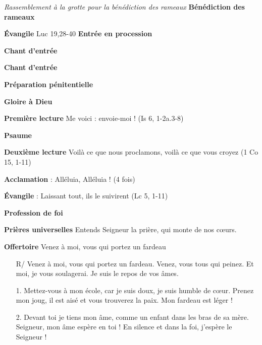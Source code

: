 \documentclass[10pt,a4paper]{article}
\newcommand{\SepRule}{\noindent							 %
						\begin{center}
							\rule{250pt}{1pt}
						\end{center}
						}
\newcommand{\NewsItem}[1]{%
\vspace{4pt}
		\large \textbf{#1} \vspace{4pt}
        \normalsize \normalfont}
\begin{document}





\textit{Rassemblement à la grotte pour la bénédiction des rameaux}
\NewsItem{Bénédiction des rameaux}
	
\NewsItem{Évangile} Luc 19,28-40
\NewsItem{Entrée en procession}

	\NewsItem{Chant d'entrée}
	
\NewsItem{Chant d'entrée}

\NewsItem{Préparation pénitentielle}


\NewsItem{Gloire à Dieu}  


\NewsItem{Première lecture}
\og Me voici : envoie-moi ! \fg (Is 6, 1-2a.3-8)

\NewsItem{Psaume}


\NewsItem{Deuxième lecture}
\og Voilà ce que nous proclamons, voilà ce que vous croyez \fg (1 Co 15, 1-11)


\NewsItem{Acclamation} : Alléluia, Alléluia ! (4 fois)

\NewsItem{Évangile} : \og Laissant tout, ils le suivirent \fg (Lc 5, 1-11)


\NewsItem{Profession de foi} 


\NewsItem{Prières universelles} 
Entends Seigneur la prière, qui monte de nos cœurs.
\newpage

\NewsItem{Offertoire} 
Venez à moi, vous qui portez un fardeau 
\begin{itemize}
\item[R/] Venez à moi, vous qui portez un fardeau. Venez, vous tous qui peinez. 
     Et moi, je vous soulagerai. Je suis le repos de vos âmes.
\item[1.]  Mettez-vous à mon école, car je suis doux, je suis humble de cœur. Prenez 
      mon joug, il est aisé et vous trouverez la paix. Mon fardeau est léger !
\item[2.]
Devant toi je tiens mon âme, comme un enfant dans les bras de sa mère. Seigneur, mon âme espère en toi ! En silence et dans la foi, j'espère le Seigneur !
\end{itemize}
\end{document}
